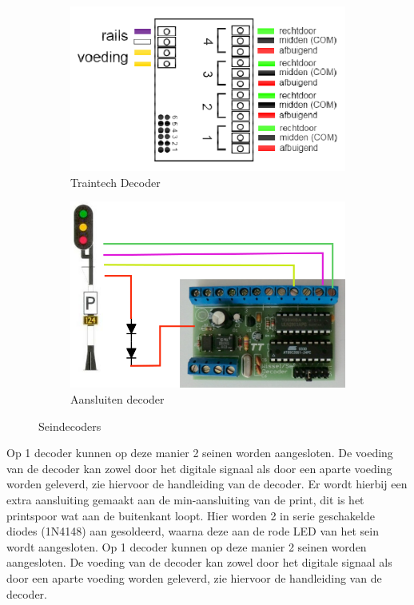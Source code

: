 \documentclass[12pt,a4paper]{report}
\begin{document}
\begin{figure}[!ht]
  \centering
  \begin{subfigure}{.5\textwidth}
    \includegraphics[scale=0.4]{images/traintech_decoder}
    \caption{Traintech Decoder\label{im:traintech_decoder}}
  \end{subfigure}%
  \begin{subfigure}{.5\textwidth}
    \includegraphics[scale=0.5]{images/aansluiting_seinen}
    \caption{Aansluiten decoder\label{im:aansturing_sein}}
   \end{subfigure}
   \caption{Seindecoders}
\end{figure}

Op 1 decoder kunnen op deze manier 2 seinen worden aangesloten.
De voeding van de decoder kan zowel door het digitale signaal als door een aparte voeding worden geleverd, zie hiervoor de handleiding van de decoder.
Er wordt hierbij een extra aansluiting gemaakt aan de min-aansluiting van de print, dit is het printspoor wat aan de buitenkant loopt. Hier worden 2 in serie geschakelde diodes (1N4148) aan gesoldeerd, waarna deze aan de rode LED van het sein wordt aangesloten.
Op 1 decoder kunnen op deze manier 2 seinen worden aangesloten.
De voeding van de decoder kan zowel door het digitale signaal als door een aparte voeding worden geleverd, zie hiervoor de handleiding van de decoder.
\end{document}
